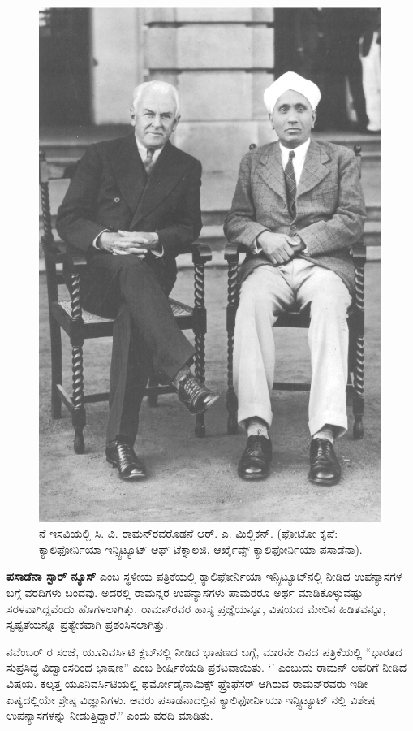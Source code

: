 \begin{figure}[tb]
\includegraphics{"images/4.jpg"}
\caption{ನೆ ಇಸವಿಯಲ್ಲಿ ಸಿ. ವಿ. ರಾಮನ್‍ರವರೊಡನೆ ಆರ್. ಎ. ಮಿಲ್ಲಿಕನ್. (ಫೋಟೋ ಕೃಪೆ: ಕ್ಯಾಲಿಫೋರ್ನಿಯಾ ಇನ್ಸ್ಟಿಟ್ಯೂಟ್ ಆಫ್ ಟೆಕ್ನಾಲಜಿ, ಆರ್ಖೈವ್ಸ್ ಕ್ಯಾಲಿಫೋರ್ನಿಯಾ ಪಸಾಡೆನಾ).}
\end{figure}

\textbf{ಪಸಾಡೆನಾ ಸ್ಟಾರ್ ನ್ಯೂಸ್} ಎಂಬ ಸ್ಥಳೀಯ ಪತ್ರಿಕೆಯಲ್ಲಿ ಕ್ಯಾಲಿಫೋರ್ನಿಯಾ ಇನ್ಸ್ಟಿಟ್ಯೂಟ್‍ನಲ್ಲಿ ನೀಡಿದ ಉಪನ್ಯಾಸಗಳ ಬಗ್ಗೆ ವರದಿಗಳು ಬಂದವು. ಅದರಲ್ಲಿ ರಾಮನ್ನರ ಉಪನ್ಯಾಸಗಳು ಪಾಮರರೂ ಅರ್ಥ ಮಾಡಿಕೊಳ್ಳುವಷ್ಟು ಸರಳವಾಗಿದ್ದವೆಂದು ಹೊಗಳಲಾಗಿತ್ತು. ರಾಮನ್‍ರವರ ಹಾಸ್ಯ ಪ್ರಜ್ಞೆಯನ್ನೂ, ವಿಷಯದ ಮೇಲಿನ ಹಿಡಿತವನ್ನೂ, ಸ್ವಷ್ಟತೆಯನ್ನೂ ಪ್ರತ್ಯೇಕವಾಗಿ ಪ್ರಶಂಸಿಸಲಾಗಿತ್ತು.

 ನವೆಂಬರ್ ರ ಸಂಜೆ, ಯೂನಿವರ್ಸಿಟಿ ಕ್ಲಬ್‍ನಲ್ಲಿ ನೀಡಿದ ಭಾಷಣದ ಬಗ್ಗೆ, ಮಾರನೇ ದಿನದ ಪತ್ರಿಕೆಯಲ್ಲಿ “ಭಾರತದ ಸುಪ್ರಸಿದ್ಧ ವಿದ್ವಾಂಸರಿಂದ ಭಾಷಣ” ಎಂಬ ಶೀರ್ಷಿಕೆಯಡಿ ಪ್ರಕಟವಾಯಿತು. ‘\textit{}’ ಎಂಬುದು ರಾಮನ್ ಅವರಿಗೆ ನೀಡಿದ ವಿಷಯ. ಕಲ್ಕತ್ತ ಯೂನಿವರ್ಸಿಟಿಯಲ್ಲಿ ಥರ್ಮೋಡೈನಾಮಿಕ್ಸ್ ಫ್ರೊಫೆಸರ್ ಆಗಿರುವ ರಾಮನ್‍ರವರು ಇಡೀ ಏಷ್ಯದಲ್ಲಿಯೇ ಶ್ರೇಷ್ಠ ವಿಜ್ಞಾನಿಗಳು. ಅವರು ಪಸಾಡೆನಾದಲ್ಲಿನ ಕ್ಯಾಲಿಫೋರ್ನಿಯಾ ಇನ್ಸ್ಟಿಟ್ಯೂಟ್ ನಲ್ಲಿ ವಿಶೇಷ ಉಪನ್ಯಾಸಗಳನ್ನು ನೀಡುತ್ತಿದ್ದಾರೆ.” ಎಂದು ವರದಿ ಮಾಡಿತು.

